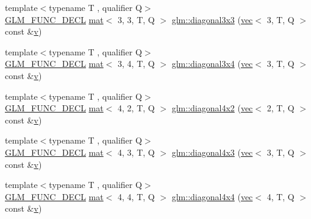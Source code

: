 \begin{DoxyCompactItemize}
\item 
{\footnotesize template$<$typename T , qualifier Q$>$ }\\\hyperlink{setup_8hpp_ab2d052de21a70539923e9bcbf6e83a51}{G\+L\+M\+\_\+\+F\+U\+N\+C\+\_\+\+D\+E\+CL} \hyperlink{structglm_1_1mat}{mat}$<$ 3, 3, T, Q $>$ \hyperlink{group__gtx__matrix__operation_ga5487ff9cdbc8e04d594adef1bcb16ee0}{glm\+::diagonal3x3} (\hyperlink{structglm_1_1vec}{vec}$<$ 3, T, Q $>$ const \&\hyperlink{_s_d_l__opengl_8h_a10a82eabcb59d2fcd74acee063775f90}{v})
\item 
{\footnotesize template$<$typename T , qualifier Q$>$ }\\\hyperlink{setup_8hpp_ab2d052de21a70539923e9bcbf6e83a51}{G\+L\+M\+\_\+\+F\+U\+N\+C\+\_\+\+D\+E\+CL} \hyperlink{structglm_1_1mat}{mat}$<$ 3, 4, T, Q $>$ \hyperlink{group__gtx__matrix__operation_gad7551139cff0c4208d27f0ad3437833e}{glm\+::diagonal3x4} (\hyperlink{structglm_1_1vec}{vec}$<$ 3, T, Q $>$ const \&\hyperlink{_s_d_l__opengl_8h_a10a82eabcb59d2fcd74acee063775f90}{v})
\item 
{\footnotesize template$<$typename T , qualifier Q$>$ }\\\hyperlink{setup_8hpp_ab2d052de21a70539923e9bcbf6e83a51}{G\+L\+M\+\_\+\+F\+U\+N\+C\+\_\+\+D\+E\+CL} \hyperlink{structglm_1_1mat}{mat}$<$ 4, 2, T, Q $>$ \hyperlink{group__gtx__matrix__operation_gacb8969e6543ba775c6638161a37ac330}{glm\+::diagonal4x2} (\hyperlink{structglm_1_1vec}{vec}$<$ 2, T, Q $>$ const \&\hyperlink{_s_d_l__opengl_8h_a10a82eabcb59d2fcd74acee063775f90}{v})
\item 
{\footnotesize template$<$typename T , qualifier Q$>$ }\\\hyperlink{setup_8hpp_ab2d052de21a70539923e9bcbf6e83a51}{G\+L\+M\+\_\+\+F\+U\+N\+C\+\_\+\+D\+E\+CL} \hyperlink{structglm_1_1mat}{mat}$<$ 4, 3, T, Q $>$ \hyperlink{group__gtx__matrix__operation_gae235def5049d6740f0028433f5e13f90}{glm\+::diagonal4x3} (\hyperlink{structglm_1_1vec}{vec}$<$ 3, T, Q $>$ const \&\hyperlink{_s_d_l__opengl_8h_a10a82eabcb59d2fcd74acee063775f90}{v})
\item 
{\footnotesize template$<$typename T , qualifier Q$>$ }\\\hyperlink{setup_8hpp_ab2d052de21a70539923e9bcbf6e83a51}{G\+L\+M\+\_\+\+F\+U\+N\+C\+\_\+\+D\+E\+CL} \hyperlink{structglm_1_1mat}{mat}$<$ 4, 4, T, Q $>$ \hyperlink{group__gtx__matrix__operation_ga0b4cd8dea436791b072356231ee8578f}{glm\+::diagonal4x4} (\hyperlink{structglm_1_1vec}{vec}$<$ 4, T, Q $>$ const \&\hyperlink{_s_d_l__opengl_8h_a10a82eabcb59d2fcd74acee063775f90}{v})
\end{DoxyCompactItemize}


